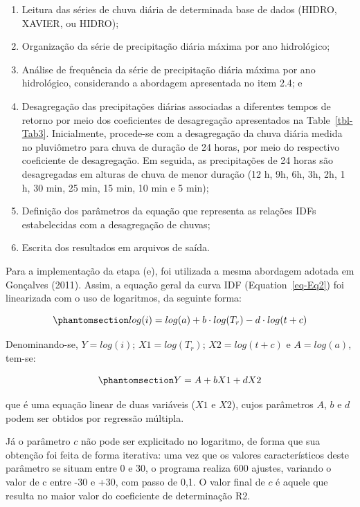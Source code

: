 \documentclass[
]{agujournal2019}
\begin{document}
\begin{enumerate}
\def\labelenumi{\alph{enumi}.}
\item
  Leitura das séries de chuva diária de determinada base de dados
  (HIDRO, XAVIER, ou HIDRO);
\item
  Organização da série de precipitação diária máxima por ano
  hidrológico;
\item
  Análise de frequência da série de precipitação diária máxima por ano
  hidrológico, considerando a abordagem apresentada no item 2.4; e
\item
  Desagregação das precipitações diárias associadas a diferentes tempos
  de retorno por meio dos coeficientes de desagregação apresentados na
  Table~\ref{tbl-Tab3}. Inicialmente, procede-se com a desagregação da
  chuva diária medida no pluviômetro para chuva de duração de 24 horas,
  por meio do respectivo coeficiente de desagregação. Em seguida, as
  precipitações de 24 horas são desagregadas em alturas de chuva de
  menor duração (12 h, 9h, 6h, 3h, 2h, 1 h, 30 min, 25 min, 15 min, 10
  min e 5 min);
\item
  Definição dos parâmetros da equação que representa as relações IDFs
  estabelecidas com a desagregação de chuvas;
\item
  Escrita dos resultados em arquivos de saída.
\end{enumerate}

Para a implementação da etapa (e), foi utilizada a mesma abordagem
adotada em Gonçalves (2011). Assim, a equação geral da curva IDF
(Equation~\ref{eq-Eq2}) foi linearizada com o uso de logaritmos, da
seguinte forma:

\begin{equation}\phantomsection\label{eq-Eq3}{
log(i)=log(a) + b\cdot log(T_r) - d\cdot log(t+c)
}\end{equation}

Denominando-se, \(Y=log(i)\); \(X1=log(T_r)\); \(X2=log(t+c)\) e
\(A=log(a)\), tem-se:

\begin{equation}\phantomsection\label{eq-Eq4}{
Y=A + bX1 + dX2
}\end{equation}

que é uma equação linear de duas variáveis (\(X1\) e \(X2\)), cujos
parâmetros \(A\), \(b\) e \(d\) podem ser obtidos por regressão
múltipla.

Já o parâmetro \(c\) não pode ser explicitado no logaritmo, de forma que
sua obtenção foi feita de forma iterativa: uma vez que os valores
característicos deste parâmetro se situam entre 0 e 30, o programa
realiza 600 ajustes, variando o valor de c entre -30 e +30, com passo de
0,1. O valor final de \(c\) é aquele que resulta no maior valor do
coeficiente de determinação R2.
\end{document}
